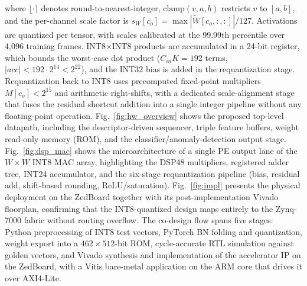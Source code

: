 \documentclass[conference]{IEEEtran}
\begin{document}
where $\lfloor\cdot\rceil$ denotes round-to-nearest-integer, $\text{clamp}(v,a,b)$ restricts $v$ to $[a,b]$, and the per-channel scale factor is $s_W[c_o]=\max|\tilde{W}[c_o,:,:]|/127$. Activations are quantized per tensor, with scales calibrated at the 99.99th percentile over 4,096 training frames. INT8$\times$INT8 products are accumulated in a 24-bit register, which bounds the worst-case dot product ($C_{in}K = 192$ terms, $|acc| < 192 \cdot 2^{14} < 2^{22}$), and the INT32 bias is added in the requantization stage. Requantization back to INT8 uses precomputed fixed-point multipliers $M[c_o]<2^{15}$ and arithmetic right-shifts, with a dedicated scale-alignment stage that fuses the residual shortcut addition into a single integer pipeline without any floating-point operation. Fig.~\ref{fig:hw_overview} shows the proposed top-level datapath, including the descriptor-driven sequencer, triple feature buffers, weight read-only memory (ROM), and the classifier/anomaly-detection output stage. Fig.~\ref{fig:dsp_mac} shows the microarchitecture of a single PE output lane of the $W\!\times\!W$ INT8 MAC array, highlighting the DSP48 multipliers, registered adder tree, INT24 accumulator, and the six-stage requantization pipeline (bias, residual add, shift-based rounding, ReLU/saturation). Fig.~\ref{fig:impl} presents the physical deployment on the ZedBoard together with its post-implementation Vivado floorplan, confirming that the INT8-quantized design maps entirely to the Zynq-7000 fabric without routing overflow. The co-design flow spans five stages: Python preprocessing of INT8 test vectors, PyTorch BN folding and quantization, weight export into a $462\times512$-bit ROM, cycle-accurate RTL simulation against golden vectors, and Vivado synthesis and implementation of the accelerator IP on the ZedBoard, with a Vitis bare-metal application on the ARM core that drives it over AXI4-Lite. %
\end{document}
